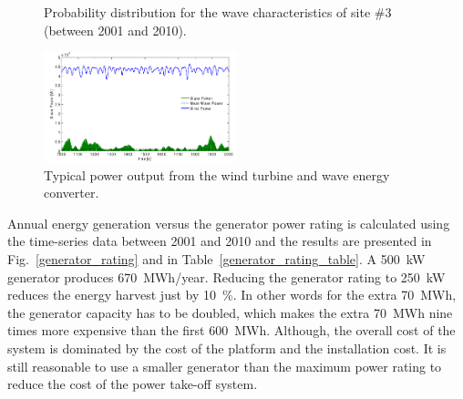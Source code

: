 \documentclass[twocolumn]{article}
\begin{document}
\begin{figure}[]
  \centering

    \caption{Probability distribution for the wave characteristics of site \#3 (between 2001 and 2010).} 
    \label{spain_site}
\end{figure}


  \begin{figure}[]
    \centering
    \includegraphics[width=0.5\textwidth]{power_input}
    \caption{Typical power output from the wind turbine and wave energy converter.} 
    \label{power_input}
  \end{figure}

Annual energy generation versus the generator power rating is calculated using the time-series data between 2001 and 2010 and the results are presented in Fig.~\ref{generator_rating} and in Table~\ref{generator_rating_table}. A 500~kW generator produces 670~MWh/year. Reducing the generator rating to 250~kW reduces the energy harvest just by 10~\%. In other words for the extra 70~MWh, the generator capacity has to be doubled, which makes the extra 70~MWh nine times more expensive than the first 600~MWh. Although, the overall cost of the system is dominated by the cost of the platform and the installation cost. It is still reasonable to use a smaller generator than the maximum power rating to reduce the cost of the power take-off system.
\end{document}
